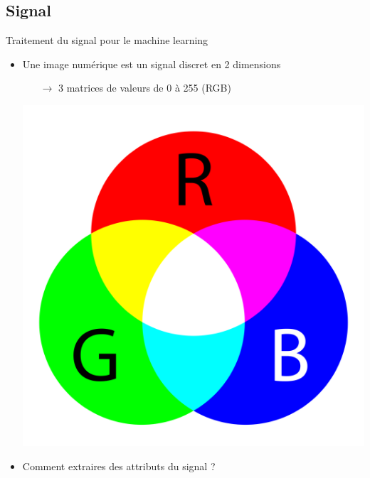 \documentclass[compress]{beamer}
\begin{document}
\subsection{Signal}
\begin{frame}{Traitement du signal pour le machine learning}
  \begin{itemize}
    \item Une image numérique est un signal discret en 2 dimensions
    \begin{itemize}
      \item[$\rightarrow$] 3 matrices de valeurs de 0 à 255 (RGB)
    \end{itemize}
    \begin{center}
      \includegraphics[width=0.3\linewidth]{resources/RGB}
    \end{center}
    \item Comment extraires des attributs du signal ?
  \end{itemize}
\end{frame}
\end{document}
